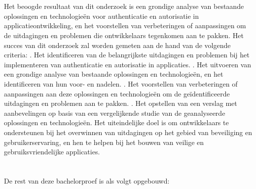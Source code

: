 \section{}%
\label{sec:onderzoeksdoelstelling}

Het beoogde resultaat van dit onderzoek is een grondige analyse van bestaande oplossingen en technologieën voor authenticatie en autorisatie in applicatieontwikkeling, en het voorstellen van 
verbeteringen of aanpassingen om de uitdagingen en problemen die ontwikkelaars tegenkomen aan te pakken. 
\newline
\newline
Het succes van dit onderzoek zal worden gemeten aan de hand van de volgende criteria:
\newline
{}. Het identificeren van de belangrijkste uitdagingen en problemen bij het implementeren van authenticatie en autorisatie in applicaties.
. Het uitvoeren van een grondige analyse van bestaande oplossingen en technologieën, en het identificeren van hun voor- en nadelen.
. Het voorstellen van verbeteringen of aanpassingen aan deze oplossingen en technologieën om de geïdentificeerde uitdagingen en problemen aan te pakken.
. Het opstellen van een verslag met aanbevelingen op basis van een vergelijkende studie van de geanalyseerde oplossingen en technologieën.
\newline
\newline
Het uiteindelijke doel is om ontwikkelaars te ondersteunen bij het overwinnen van uitdagingen op het gebied van beveiliging en gebruikerservaring, en hen te helpen bij het bouwen van veilige en 
gebruiksvriendelijke applicaties.

\section{}%
\label{sec:opzet-bachelorproef}


De rest van deze bachelorproef is als volgt opgebouwd:


